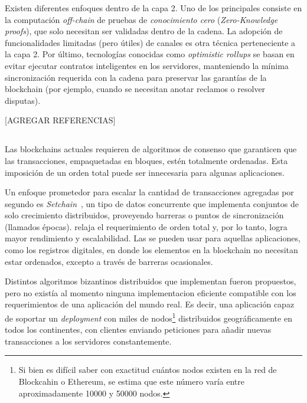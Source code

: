 Existen diferentes enfoques dentro de la capa 2.
%
Uno de los principales consiste en la computación \emph{off-chain} de pruebas de \emph{conocimiento cero}
(\emph{Zero-Knowledge proofs}), que solo necesitan ser validadas dentro de la cadena.
%
La adopción de funcionalidades limitadas (pero útiles) de canales es otra técnica perteneciente a la capa 2.
%
Por último, tecnologías conocidas como \emph{optimistic rollups} se basan en evitar ejecutar contratos inteligentes
en los servidores, manteniendo la mínima sincronización requerida con la cadena para preservar las garantías
de la blockchain (por ejemplo, cuando se necesitan anotar reclamos o resolver disputas).

[AGREGAR REFERENCIAS]

\subsection{\setchain}
Las blockchains actuales requieren de algoritmos de consenso que garanticen que las
transacciones, empaquetadas en bloques, estén totalmente ordenadas.
%
Esta imposición de un orden total puede ser innecesaria para algunas aplicaciones.

%
Un enfoque prometedor para escalar la cantidad de transacciones agregadas por segundo
es \textit{Setchain}~\cite{Capretto.2022.Setchain},
un tipo de datos concurrente que implementa conjuntos de solo crecimiento distribuidos,
proveyendo barreras o puntos de sincronización (llamados épocas).
%
\setchain relaja el requerimiento de orden total y, por lo tanto, logra mayor
rendimiento y escalabilidad.
%
Las \setchains se pueden usar para aquellas aplicaciones, como los registros digitales,
en donde los elementos en la blockchain no necesitan estar ordenados, excepto a través
de barreras ocasionales.

%
Distintos algoritmos bizantinos distribuidos que implementan \setchain fueron
propuestos, pero no existía al momento ninguna implementacion eficiente compatible con
los requerimientos de una aplicación del mundo real.
Es decir, una aplicación capaz de soportar un \textit{deployment} con miles de nodos\footnote{Si bien
es difícil saber con exactitud cuántos nodos existen en la red de Blockcahin o Ethereum, se estima
que este número varía entre aproximadamente 10000 y 50000 nodos.}
distribuidos geográficamente en todos los continentes, con clientes enviando peticiones para
añadir nuevas transacciones a los servidores constantemente.

